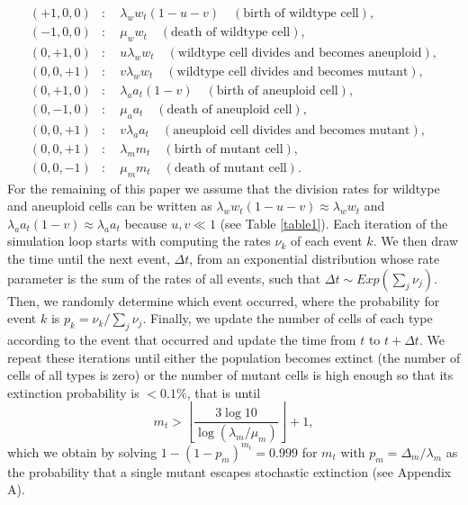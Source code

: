 \documentclass[12pt]{extarticle}
\begin{document}
\begin{subequations}
\begin{flalign*}
(+1,0,0)&:\quad \lambda_ww_t\left(1-u-v\right)\quad\left(\text{birth of wildtype cell}\right),\\
(-1,0,0)&:\quad \mu_ww_t\quad\left(\text{death of wildtype cell}\right),\\
(0,+1,0)&:\quad u\lambda_ww_t\quad\left(\text{wildtype cell divides and becomes aneuploid}\right),\\
(0,0,+1)&:\quad v\lambda_ww_t\quad\left(\text{wildtype cell divides and becomes mutant}\right),\\
(0,+1,0)&:\quad \lambda_aa_t\left(1-v\right)\quad\left(\text{birth of aneuploid cell}\right),\\
(0,-1,0)&:\quad \mu_aa_t\quad\left(\text{death of aneuploid cell}\right),\\
(0,0,+1)&:\quad v\lambda_aa_t\quad\left(\text{aneuploid cell divides and becomes mutant}\right),\\
(0,0,+1)&:\quad \lambda_mm_t\quad\left(\text{birth of mutant cell}\right),\\
(0,0,-1)&:\quad \mu_mm_t\quad\left(\text{death of mutant cell}\right).
\end{flalign*}
\end{subequations}
For the remaining of this paper we assume that the division rates for wildtype and aneuploid cells can be written as $\lambda_ww_t\left(1-u-v\right)\approx \lambda_ww_t$ and $\lambda_aa_t\left(1-v\right)\approx\lambda_aa_t$ because $u,v\ll1$ (see Table \ref{table1}).
Each iteration of the simulation loop starts with computing the rates $\nu_k$ of each event $k$.
We then draw the time until the next event, $\Delta t$, from an exponential distribution whose rate parameter is the sum of the rates of all events, such that $\Delta t \sim \textit{Exp}(\sum_j \nu_j)$.
Then, we randomly determine which event occurred, where the probability for event $k$ is $p_k = \nu_k/\sum_j \nu_j$.
Finally, we update the number of cells of each type according to the event that occurred and update the time from $t$ to $t+\Delta t$.
We repeat these iterations until either the population becomes extinct (the number of cells of all types is zero) or the number of mutant cells is high enough so that its extinction probability is $<0.1\%$, that is until
\begin{equation*}
m_t > \left\lfloor\frac{3\log{10}}{\log{\left(\lambda_m / \mu_m\right)}}\right\rfloor + 1 ,
\end{equation*}
which we obtain by solving $1-(1-p_m)^{m_t}=0.999$ for $m_t$ with $p_m=\Delta_m/\lambda_m$ as the probability that a single mutant escapes stochastic extinction  (see Appendix A).
\end{document}

